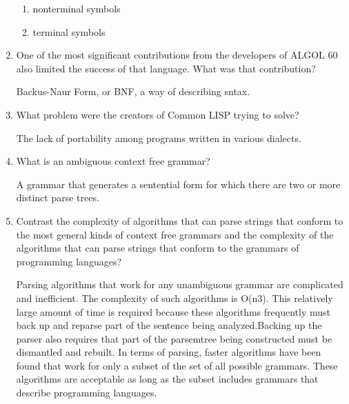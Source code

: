 \begin{enumerate}
\begin{answer}
  \begin{enumerate}
    \item nonterminal symbols
    \item terminal symbols
    \end{enumerate}

    \end{answer}


  \item One of the most significant contributions from the developers
    of ALGOL 60 also limited the success of that language. What was
    that contribution?

  \begin{answer}

    Backus-Naur Form, or BNF, a way of describing sntax.

    \end{answer}

  \item What problem were the creators of Common LISP trying to solve?

  \begin{answer}

    The lack of portability among programs written in various dialects.

    \end{answer}

  \item What is an ambiguous context free grammar?

  \begin{answer}

    A grammar that generates a sentential form for which there are two or more distinct parse trees.

    \end{answer}

  \item Contrast the complexity of algorithms that can parse strings
    that conform to the most general kinds of context free grammars
    and the complexity of the algorithms that can parse strings that
    conform to the grammars of programming languages?

  \begin{answer}

    Parsing algorithms that work for any unambiguous grammar are complicated
and inefficient. The complexity of such algorithms is O(n3). This relatively large amount of time is required because these algorithms frequently must back up and reparse part of the sentence being analyzed.Backing up the parser also requires that part of the parsemtree being constructed must be dismantled and rebuilt.
    In terms of parsing, faster algorithms have been found that work for only a subset of the set of all possible grammars. These algorithms are acceptable as long as the subset includes grammars that describe programming languages.


\end{answer}
\end{enumerate}
